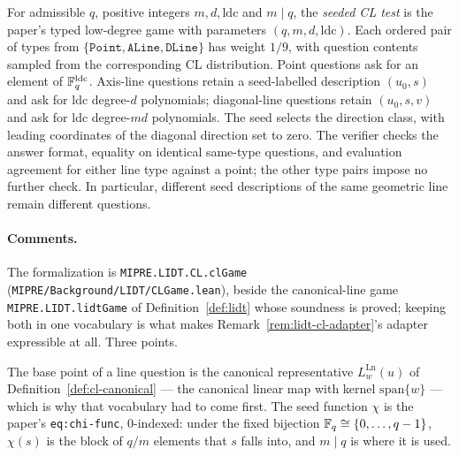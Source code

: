 \begin{definition}
\label{def:lidt-cl}
\leanok
For admissible $q$, positive integers $m,d,\mathrm{ldc}$ and $m\mid q$, the
\emph{seeded CL test} is the paper's typed low-degree game with parameters
$(q,m,d,\mathrm{ldc})$. Each ordered pair of types from
$\{\mathtt{Point},\mathtt{ALine},\mathtt{DLine}\}$ has weight $1/9$, with question
contents sampled from the corresponding CL distribution. Point questions ask for
an element of $\mathbb{F}_q^{\mathrm{ldc}}$. Axis-line questions retain a seed-labelled
description $(u_0,s)$ and ask for $\mathrm{ldc}$ degree-$d$ polynomials; diagonal-line
questions retain $(u_0,s,v)$ and ask for $\mathrm{ldc}$ degree-$md$ polynomials.
The seed selects the direction class, with leading coordinates of the diagonal
direction set to zero. The verifier checks the answer format, equality on identical
same-type questions, and evaluation agreement for either line type against a point;
the other type pairs impose no further check. In particular, different seed
descriptions of the same geometric line remain different questions.
\end{definition}

\paragraph{Comments.} The formalization is \texttt{MIPRE.LIDT.CL.clGame}
(\texttt{MIPRE/Background/LIDT/CLGame.lean}), beside the canonical-line game
\texttt{MIPRE.LIDT.lidtGame} of Definition~\ref{def:lidt} whose soundness is proved; keeping
both in one vocabulary is what makes Remark~\ref{rem:lidt-cl-adapter}'s adapter expressible at
all. Three points.

The base point of a line question is the canonical representative $L^{\mathrm{Ln}}_w(u)$ of
Definition~\ref{def:cl-canonical} --- the canonical linear map with kernel
$\mathrm{span}\{w\}$ --- which is why that vocabulary had to come first. The seed function
$\chi$ is the paper's \texttt{eq:chi-func}, $0$-indexed: under the fixed bijection
$\mathbb{F}_q \cong \{0, \ldots, q-1\}$, $\chi(s)$ is the block of $q/m$ elements that $s$ falls into,
and $m \mid q$ is where it is used.

